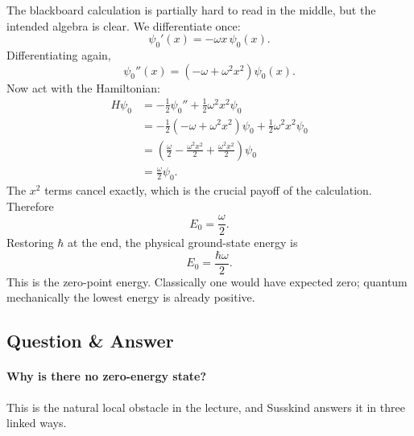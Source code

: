 The blackboard calculation is partially hard to read in the middle, but the intended algebra is clear. We differentiate once:
\begin{equation}
\psi_{0}'(x)=-\omega x\,\psi_{0}(x).
\end{equation}
Differentiating again,
\begin{equation}
\psi_{0}''(x)=(-\omega+\omega^{2}x^{2})\psi_{0}(x).
\end{equation}
Now act with the Hamiltonian:
\begin{align}
H\psi_{0}
&=
-\frac{1}{2}\psi_{0}''+\frac{1}{2}\omega^{2}x^{2}\psi_{0} \\
&=
-\frac{1}{2}(-\omega+\omega^{2}x^{2})\psi_{0}
+\frac{1}{2}\omega^{2}x^{2}\psi_{0} \\
&=
\left(
\frac{\omega}{2}
-\frac{\omega^{2}x^{2}}{2}
+\frac{\omega^{2}x^{2}}{2}
\right)\psi_{0} \\
&=
\frac{\omega}{2}\psi_{0}.
\end{align}
The \(x^{2}\) terms cancel exactly, which is the crucial payoff of the calculation. Therefore
\begin{equation}
E_{0}=\frac{\omega}{2}.
\end{equation}
Restoring \(\hbar\) at the end, the physical ground-state energy is
\begin{equation}
E_{0}=\frac{\hbar\omega}{2}.
\end{equation}
This is the zero-point energy. Classically one would have expected zero; quantum mechanically the lowest energy is already positive.

\subsection{Question \& Answer}

\paragraph{Why is there no zero-energy state?}

This is the natural local obstacle in the lecture, and Susskind answers it in three linked ways.

